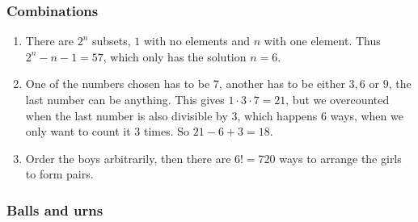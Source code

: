 \documentclass[10pt,paper=letter]{scrartcl}
\begin{document}
\subsubsection*{Combinations}

\begin{enumerate}

\item There are $2^n$ subsets, $1$ with no elements and $n$ with one element. Thus $2^n - n - 1 = 57$, which only has the solution $n = 6$.

\item One of the numbers chosen has to be $7$, another has to be either $3, 6$ or $9$, the last number can be anything. This gives $1 \cdot 3 \cdot 7 = 21$, but we overcounted when the last number is also divisible by $3$, which happens $6$ ways, when we only want to count it $3$ times. So $21 - 6 + 3 = 18$.

\item Order the boys arbitrarily, then there are $6! = 720$ ways to arrange the girls to form pairs.

\end{enumerate}

\subsubsection*{Balls and urns}
\end{document}
